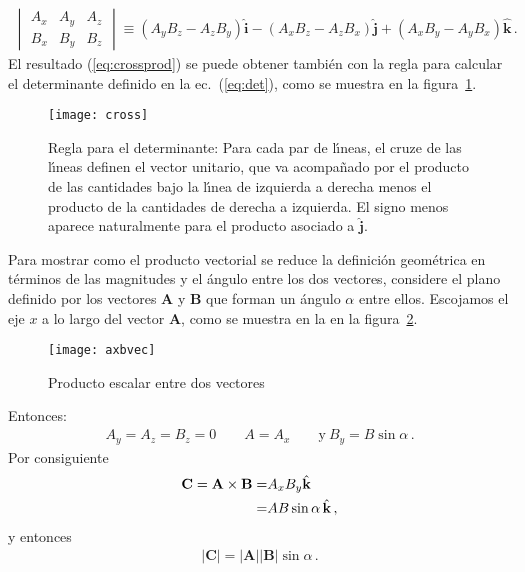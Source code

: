\begin{frame}
\begin{align}
\begin{vmatrix}
    A_x & A_y & A_z\\
    B_x & B_y & B_z
  \end{vmatrix}\equiv\left(A_yB_z-A_zB_y\right)\hat{\mathbf{i}}
-\left(A_xB_z-A_zB_x\right)\hat{\mathbf{j}}
+\left(A_xB_y-A_yB_x\right)\hat{\mathbf{k}}\,.
\end{align}
El resultado (\ref{eq:crossprod}) se puede obtener tambi\'en con la
regla para calcular el determinante definido en la ec.~(\ref{eq:det}),
como se muestra en la figura~\ref{fig:cross}.
\begin{figure}
  \centering
  \texttt{[image: cross]}
  \caption{Regla para el determinante: Para cada par de l\'\i neas, el cruze de las l\'\i neas definen
    el vector unitario, que va acompa\~nado por el producto de las
    cantidades bajo la l\'\i nea de izquierda  a derecha menos el producto
    de la cantidades de derecha a izquierda. El signo menos aparece
    naturalmente para el producto asociado a $\hat{\mathbf{j}}$.  }
  \label{fig:cross}
\end{figure}

Para mostrar como el producto vectorial se reduce la definici\'on
geom\'etrica en t\'erminos de las magnitudes y el \'angulo entre los dos
vectores, considere el plano definido por los vectores $\mathbf{A}$ y
$\mathbf{B}$ que forman un \'angulo $\alpha$ entre ellos. Escojamos el eje
$x$ a lo largo del vector $\mathbf{A}$, como se muestra en la en la figura~\ref{fig:axbvec}. 

\begin{figure}
  \centering
  \texttt{[image: axbvec]}
  \caption{Producto escalar entre dos vectores}
  \label{fig:axbvec}
\end{figure} 

Entonces:
\begin{align}
  A_y=A_z=B_z=0\qquad A=A_x\qquad\text{y}\ B_y=B\sin\alpha\,. 
\end{align}
Por consiguiente
\begin{align}
  \mathbf{C}=\mathbf{A}\times\mathbf{B}=&A_xB_y\hat{\mathbf{k}}\nonumber\\
  =&A B\sin\alpha\,\hat{\mathbf{k}}\,,
\end{align}
y entonces
\begin{align}
  |\mathbf{C}|=|\mathbf{A}||\mathbf{B}|\sin\alpha\,.
\end{align}
\end{frame}

